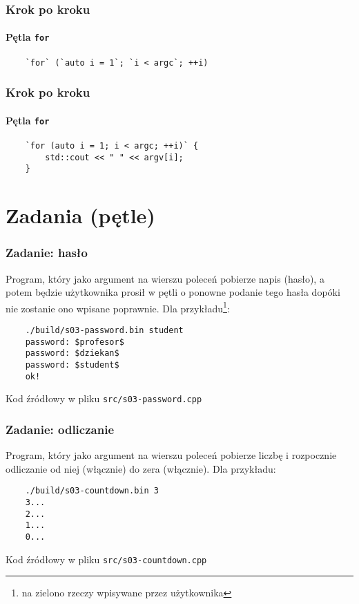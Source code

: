 \documentclass[aspectratio=169]{beamer}
\begin{document}
\begin{frame}[fragile]
    \frametitle{Krok po kroku}
    \framesubtitle{Pętla {\tt for}}

    \begin{lstlisting}
    `for` (`auto i = 1`; `i < argc`; ++i)
    \end{lstlisting}
    \vspace{2.4em}
\end{frame}

\begin{frame}[fragile]
    \frametitle{Krok po kroku}
    \framesubtitle{Pętla {\tt for}}

    \begin{lstlisting}
    `for (auto i = 1; i < argc; ++i)` {
        std::cout << " " << argv[i];
    }
    \end{lstlisting}
\end{frame}

\section{Zadania (pętle)}

\begin{frame}[fragile]
    \frametitle{Zadanie: hasło}
    \label{lecture_exercise_0}

    Program, który jako argument na wierszu poleceń pobierze napis (hasło), a
    potem będzie użytkownika prosił w pętli o ponowne podanie tego hasła dopóki
    nie zostanie ono wpisane poprawnie. Dla przykładu\footnote{{\tiny na zielono
    rzeczy wpisywane przez użytkownika}}:

    \begin{lstlisting}
    ./build/s03-password.bin student
    password: $profesor$
    password: $dziekan$
    password: $student$
    ok!
    \end{lstlisting}

    Kod źródłowy w pliku {\tt src/s03-password.cpp}
\end{frame}

\begin{frame}[fragile]
    \frametitle{Zadanie: odliczanie}
    \label{lecture_exercise_1}

    Program, który jako argument na wierszu poleceń pobierze liczbę i rozpocznie
    odliczanie od niej (włącznie) do zera (włącznie). Dla przykładu:

    \begin{lstlisting}
    ./build/s03-countdown.bin 3
    3...
    2...
    1...
    0...
    \end{lstlisting}

    Kod źródłowy w pliku {\tt src/s03-countdown.cpp}
\end{frame}
\end{document}
